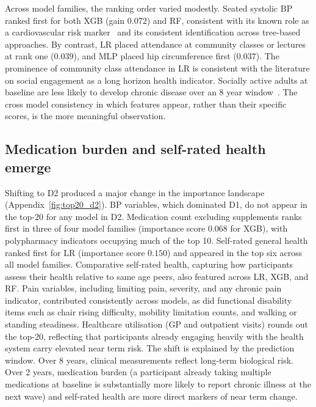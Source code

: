 Across model families, the ranking order varied modestly. Seated systolic \gls{BP} ranked first for both \gls{XGB} (gain $0.072$) and \gls{RF}, consistent with its known role as a cardiovascular risk marker~\cite{matthewsPredictingMortalityIrish2022} and its consistent identification across tree-based approaches. By contrast, \gls{LR} placed attendance at community classes or lectures at rank one ($0.039$), and \gls{MLP} placed hip circumference first ($0.037$). The prominence of community class attendance in \gls{LR} is consistent with the literature on social engagement as a long horizon health indicator. Socially active adults at baseline are less likely to develop chronic disease over an 8 year window~\cite{santiniProtectivePropertiesActBelongCommit2017}. The cross model consistency in which features appear, rather than their specific scores, is the more meaningful observation.

\subsection{Medication burden and self-rated health emerge}
Shifting to D2 produced a major change in the importance landscape (Appendix~\ref{fig:top20_d2}). \gls{BP} variables, which dominated D1, do not appear in the top-20 for any model in D2. Medication count excluding supplements ranks first in three of four model families (importance score $0.068$ for \gls{XGB}), with polypharmacy indicators occupying much of the top 10. Self-rated general health ranked first for \gls{LR} (importance score $0.150$) and appeared in the top six across all model families. Comparative self-rated health, capturing how participants assess their health relative to same age peers, also featured across \gls{LR}, \gls{XGB}, and \gls{RF}. Pain variables, including limiting pain, severity, and any chronic pain indicator, contributed consistently across models, as did functional disability items such as chair rising difficulty, mobility limitation counts, and walking or standing steadiness. Healthcare utilisation (\gls{GP} and outpatient visits) rounds out the top-20, reflecting that participants already engaging heavily with the health system carry elevated near term risk. The shift is explained by the prediction window. Over 8 years, clinical measurements reflect long-term biological risk. Over 2 years, medication burden (a participant already taking multiple medications at baseline is substantially more likely to report chronic illness at the next wave) and self-rated health are more direct markers of near term change.

